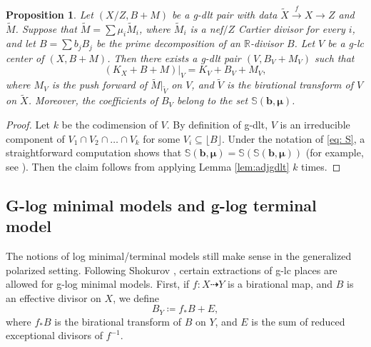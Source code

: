 \documentclass[11pt]{amsart}
\newcommand{\Rr}{\mathbb{R}}
\newtheorem{proposition}[theorem]{Proposition}
\begin{document}
\begin{proposition}\label{prop: intersection on g-lc centers}
	Let $(X/Z,B+M)$ be a g-dlt pair with data $\tilde X \xrightarrow{f} X \to Z$ and $\tilde M$. Suppose that $\tilde M=\sum \mu_i \tilde M_i$, where $\tilde M_i$ is a nef$/Z$ Cartier divisor for every $i$, and let $B=\sum b_j B_j$ be the prime decomposition of an $\Rr$-divisor $B$. Let $V$ be a g-lc center of $(X,B+M)$. Then there exists a g-dlt pair $(V, B_V+M_V)$ such that 
	\[
	(K_X+B+M)|_{V}=K_V+B_{V}+M_{V},
	\]
	where $M_{V}$ is the push forward of $\tilde{M}|_{\tilde{V}}$ on $V$, and $\tilde{V}$ is the birational transform of $V$ on $\tilde{X}$. Moreover, the coefficients of $B_{V}$ belong to the set $\mathbb{S}(\bm{b},\bm{\mu})$.
\end{proposition}
\begin{proof}
	Let $k$ be the codimension of $V$. By definition of g-dlt, $V$ is an irreducible component of $V_{1}\cap V_{2}\cap \ldots\cap V_{k}$ for some $V_{i}\subseteq  \lfloor B\rfloor$. Under the notation of \eqref{eq: S}, a straightforward computation shows that $\mathbb{S}(\bm{b},\bm{\mu})=\mathbb{S}(\mathbb{S}(\bm{b},\bm{\mu}))$ (for example, see \cite[Proposition 3.4.1]{HMX14}). Then the claim follows from applying Lemma \ref{lem:adjgdlt} $k$ times. 
\end{proof}


\subsection{G-log minimal models and g-log terminal model}\label{sec: MM and Mori fibre space}

The notions of log minimal/terminal models still make sense in the generalized polarized setting. Following Shokurov \cite{Sho92}, certain extractions of g-lc places are allowed for g-log minimal models. First, if $f: X \dashrightarrow Y$ is a birational map, and $B$ is an effective divisor on $X$, we define
\begin{equation}\label{eq: B_Y}
B_Y \coloneqq f_*B +E,
\end{equation} where $f_*B$ is the birational transform of $B$ on $Y$, and $E$ is the sum of reduced exceptional divisors of $f^{-1}$. 
\end{document}
